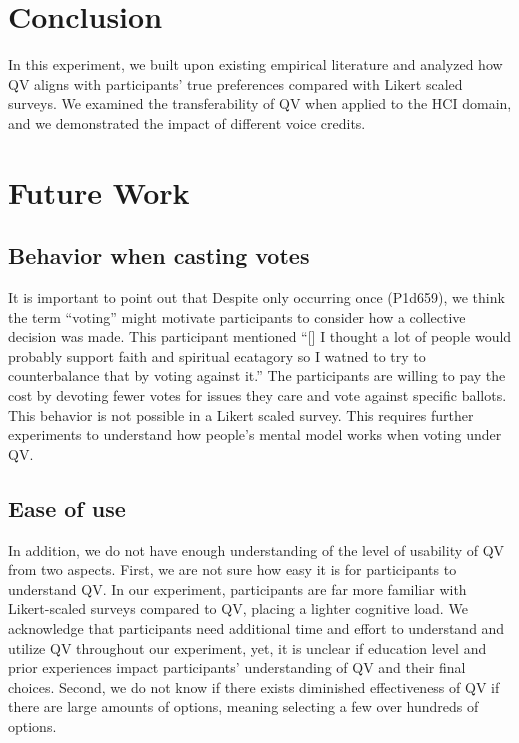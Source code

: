 \section{Conclusion} \label{conclusion}
In this experiment, we built upon existing empirical literature
and analyzed how QV aligns with participants' true preferences compared with Likert scaled surveys.
We examined the transferability of QV when applied to the HCI domain, and we demonstrated the impact of different voice credits.


\section{Future Work} \label{future}

\subsection{Behavior when casting votes} %
It is important to point out that Despite only occurring once (P1d659), we think the term ``voting'' might motivate participants to consider how a collective decision was made.
This participant mentioned ``[\textellipsis] I thought a lot of people would probably support faith and spiritual ecatagory  so I watned to try to counterbalance that by voting against it.'' The participants are willing to pay the cost by devoting fewer votes for issues they care and vote against specific ballots. This behavior is not possible in a Likert scaled survey. This requires further experiments to understand how people's mental model works when voting under QV. \par 

\subsection{Ease of use}
In addition, we do not have enough understanding of the level of usability of QV from two aspects.
First, we are not sure how easy it is for participants to understand QV.
In our experiment, participants are far more familiar with Likert-scaled surveys compared to QV, placing a lighter cognitive load.
We acknowledge that participants need additional time and effort to understand and utilize QV throughout our experiment, yet, it is unclear if education level and prior experiences impact participants' understanding of QV and their final choices.
Second, we do not know if there exists diminished effectiveness of QV if there are large amounts of options, meaning selecting a few over hundreds of options.

